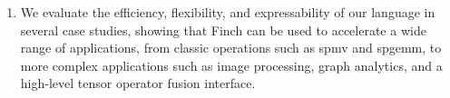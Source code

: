 \begin{enumerate}
\item We evaluate the efficiency, flexibility, and expressability of our language in several case studies, showing that Finch can be used to accelerate a wide range of applications,  from classic operations such as spmv and spgemm, to more complex applications such as image processing, graph analytics, and a high-level tensor operator fusion interface. 
\end{enumerate}
